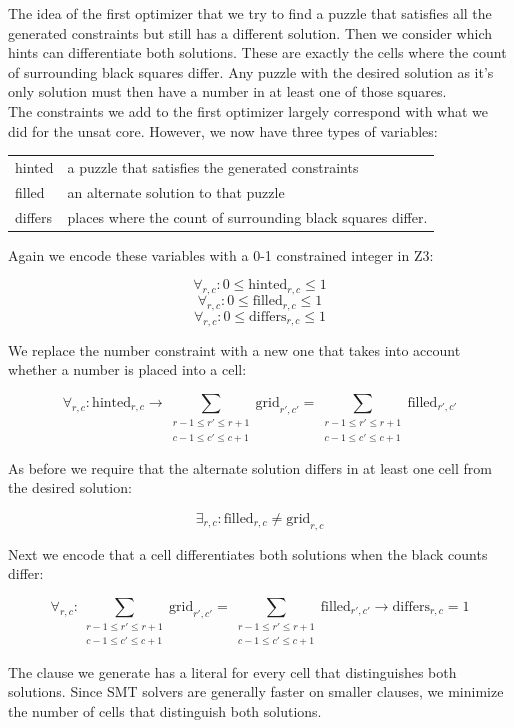 \documentclass{scrartcl}
\begin{document}
	The idea of the first optimizer that we try to find a puzzle that satisfies all the generated constraints but still has a different solution. Then we consider which hints can differentiate both solutions. These are exactly the cells where the count of surrounding black squares differ.
	Any puzzle with the desired solution as it's only solution must then have a number in at least one of those squares.\\

	The constraints we add to the first optimizer largely correspond with what we did for the unsat core. However, we now have three types of variables:

	\begin{tabular}{ll}
		hinted & a puzzle that satisfies the generated constraints\\
		filled & an alternate solution to that puzzle\\
		differs & places where the count of surrounding black squares differ.
	\end{tabular}

	Again we encode these variables with a 0-1 constrained integer in Z3:

	$$\forall_{r,c}: 0\le \text{hinted}_{r,c} \le 1$$
	$$\forall_{r,c}: 0\le \text{filled}_{r,c} \le 1$$
	$$\forall_{r,c}: 0\le \text{differs}_{r,c} \le 1$$

	We replace the number constraint with a new one that takes into account whether a number is placed into a cell:

	$$\forall_{r,c}: \text{hinted}_{r,c}\to\sum_{\substack{r-1\le r' \le r+1\\c-1\le c'\le c+1}}\text{grid}_{r',c'} = \sum_{\substack{r-1\le r' \le r+1\\c-1\le c'\le c+1}}\text{filled}_{r',c'}$$

	As before we require that the alternate solution differs in at least one cell from the desired solution:

	$$\exists_{r,c}:  \text{filled}_{r,c} \ne \text{grid}_{r,c}$$

	Next we encode that a cell differentiates both solutions when the black counts differ:

	$$\forall_{r,c}: \sum_{\substack{r-1\le r' \le r+1\\c-1\le c'\le c+1}}\text{grid}_{r',c'} = \sum_{\substack{r-1\le r' \le r+1\\c-1\le c'\le c+1}}\text{filled}_{r',c'}\to \text{differs}_{r,c}=1$$

	The clause we generate has a literal for every cell that distinguishes both solutions. Since SMT solvers are generally faster on smaller clauses, we minimize the number of cells that distinguish both solutions.
\end{document}
